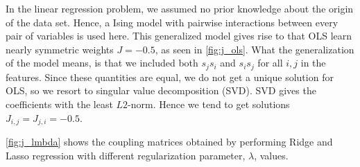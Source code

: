 In the linear regression problem, we assumed no prior knowledge about the origin of the data set. Hence, a Ising model with pairwise interactions between every pair of variables is used here. This generalized model gives rise to that OLS learn nearly symmetric weights $J=-0.5$, as seen in \autoref{fig:j_ols}. What the generalization of the model means, is that we included both $s_j s_i$ and $s_i s_j$ for all $i,j$ in the features. Since these quantities are equal, we do not get a unique solution for OLS, so we resort to singular value decomposition (SVD). SVD gives the coefficients with the least $L2$-norm. Hence we tend to get solutions $J_{i,j}=J_{j,i}=-0.5$.

\autoref{fig:j_lmbda} shows the coupling matrices obtained by performing Ridge and Lasso regression with different regularization parameter, $\lambda$, values.

